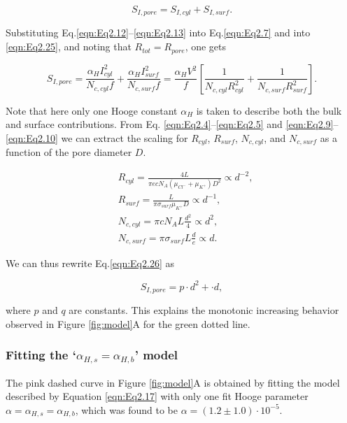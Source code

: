\begin{equation}\label{eqn:Eq2.25}
S_{I,pore}=S_{I,cyl}+S_{I,surf}.
\end{equation}


\noindent Substituting Eq.\ref{eqn:Eq2.12}–\ref{eqn:Eq2.13} into Eq.\ref{eqn:Eq2.7} and into \ref{eqn:Eq2.25}, and noting that $R_{tot}=R_{pore}$, one gets

\begin{equation}\label{eqn:Eq2.26}
S_{I,pore}=\frac{\alpha_HI_{cyl}^2}{N_{c,cyl}f}+\frac{\alpha_HI_{surf}^2}{N_{c,surf}f}=\frac{\alpha_HV^2}{f}\left[\frac{1}{N_{c,cyl}R_{cyl}^2}+\frac{1}{N_{c,surf}R_{surf}^2}\right].
\end{equation}





\noindent Note that here only one Hooge constant $\alpha_H$ is taken to describe both the bulk and surface contributions. From Eq. \ref{eqn:Eq2.4}–\ref{eqn:Eq2.5} and \ref{eqn:Eq2.9}–\ref{eqn:Eq2.10} we can extract the scaling for $R_{cyl}$, $R_{surf}$, $N_{c,cyl}$, and $N_{c,surf}$ as a function of the pore diameter $D$.

\begin{align}
\label{eqn:Eq2.27}
&R_{cyl}=\frac{4L}{\pi ecN_A(\mu_{Cl^-}+\mu_{K^+})D^2}\propto d^{-2},\\
\label{eqn:Eq2.28}
&R_{surf}=\frac{L}{\pi \sigma_{surf}\mu_{K^+}D}\propto d^{-1},\\
\label{eqn:Eq2.29}
&N_{c,cyl}=\pi cN_AL\frac{d^2}{4}\propto d^2,\\
\label{eqn:Eq2.30}
&N_{c,surf}=\pi \sigma_{surf}L\frac{d}{e}\propto d.
\end{align}


\noindent We can thus rewrite Eq.\ref{eqn:Eq2.26} as 

\begin{equation}\label{eqn:Eq2.31}
S_{I,pore}=  p\cdot d^2+\cdot d,
\end{equation}

\noindent where $p$ and $q$ are constants. This explains the monotonic increasing behavior observed in Figure \ref{fig:model}A for the green dotted line. 



\subsubsection{ Fitting the ‘$\alpha_{H,s}=\alpha_{H,b}$’ model}


The pink dashed curve in Figure \ref{fig:model}A is obtained by fitting the model described by Equation \ref{eqn:Eq2.17} with only one fit Hooge parameter $\alpha=\alpha_{H,s}=\alpha_{H,b}$, which was found to be $\alpha=(1.2\pm 1.0)\cdot 10^{-5}$. 



